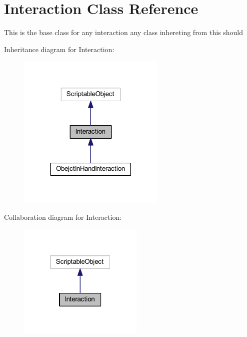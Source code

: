 \hypertarget{class_interaction}{}\section{Interaction Class Reference}
\label{class_interaction}


This is the base class for any interaction any class inhereting from this should  




Inheritance diagram for Interaction\+:
\nopagebreak
\begin{figure}[H]
\begin{center}
\leavevmode
\includegraphics[width=200pt]{class_interaction__inherit__graph}
\end{center}
\end{figure}


Collaboration diagram for Interaction\+:
\nopagebreak
\begin{figure}[H]
\begin{center}
\leavevmode
\includegraphics[width=169pt]{class_interaction__coll__graph}
\end{center}
\end{figure}
